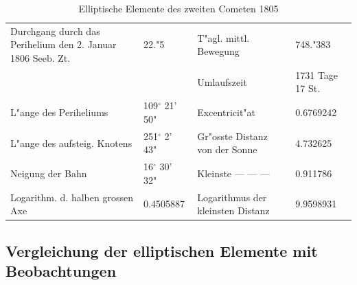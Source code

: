 \documentclass[12pt,a4paper]{article}
\begin{document}
\begin{table}[H]
\centering
\begin{tabular}{l l | l l}
\toprule
Durchgang durch das Perihelium den 2. Januar 1806 Seeb. Zt. & 22."5 & T"agl. mittl. Bewegung & 748."383 \\
& & Umlaufszeit & 1731 Tage 17 St. \\
L"ange des Periheliums & 109$^\circ$ 21' 50" & Excentricit"at & 0.6769242 \\
L"ange des aufsteig. Knotens & 251$^\circ$ 2' 43" & Gr"osste Distanz von der Sonne & 4.732625 \\
Neigung der Bahn & 16$^\circ$ 30' 32" & Kleinste \quad --- \quad --- \quad --- & 0.911786 \\
Logarithm. d. halben grossen Axe & 0.4505887 & Logarithmus der kleinsten Distanz & 9.9598931 \\
\bottomrule
\end{tabular}
\caption{Elliptische Elemente des zweiten Cometen 1805}
\end{table}

\subsection{Vergleichung der elliptischen Elemente mit Beobachtungen}
\end{document}
